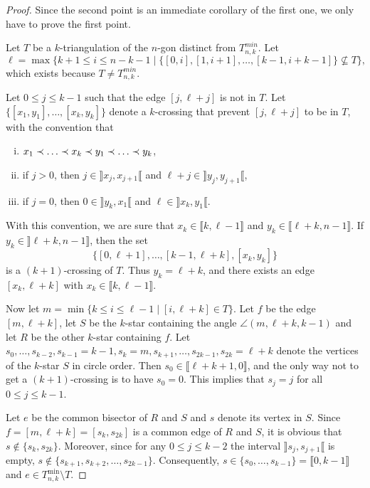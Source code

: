 \documentclass[12pt]{amsart}
\begin{document}
\begin{proof}
Since the second point is an immediate corollary of the first one, we only have to prove the first point.

Let $T$ be a $k$-triangulation of the $n$-gon distinct from $T_{n,k}^{min}$. Let
$$\ell=\max\{k+1\le i\le n-k-1\;|\;\{[0,i],[1,i+1],\ldots,[k-1,i+k-1]\}\nsubseteq T\},$$
which exists because $T\ne T_{n,k}^{min}$.

Let $0\le j\le k-1$ such that the edge $[j,\ell+j]$ is not in $T$. Let $\{[x_1,y_1],\ldots,[x_k,y_k]\}$ denote a $k$-crossing that prevent $[j,\ell+j]$ to be in $T$, with the convention that
\begin{enumerate}[(i)]
\item $x_1\prec \ldots\prec x_k\prec y_1\prec \ldots\prec y_k$,
\item if $j>0$, then $j\in\rrbracket x_j,x_{j+1}\llbracket$ and $\ell+j\in\rrbracket y_j,y_{j+1}\llbracket$,
\item if $j=0$, then $0\in\rrbracket y_k,x_1\llbracket$ and $\ell\in\rrbracket x_k,y_1\llbracket$.
\end{enumerate}
With this convention, we are sure that $x_k\in\llbracket k,\ell-1\rrbracket$ and $y_k\in\llbracket \ell+k,n-1\rrbracket$. If $y_k\in \rrbracket \ell+k,n-1\rrbracket$, then the set
$$\{[0,\ell+1],\ldots,[k-1,\ell+k],[x_k,y_k]\}$$
is a $(k+1)$-crossing of $T$. Thus $y_k=\ell+k$, and there exists an edge $[x_k,\ell+k]$ with $x_k\in\llbracket k,\ell-1\rrbracket$.

Now let $m=\min\{k\le i\le \ell-1\;|\; [i,\ell+k]\in T\}$. Let $f$ be the edge $[m,\ell+k]$, let $S$ be the $k$-star containing the angle $\angle(m,\ell+k,k-1)$ and let $R$ be the other $k$-star containing $f$. Let $s_0, \ldots,s_{k-2},s_{k-1}=k-1,s_k=m,s_{k+1},\ldots,s_{2k-1},s_{2k}=\ell+k$ denote the vertices of the $k$-star $S$ in circle order. Then $s_0\in\llbracket \ell+k+1, 0\rrbracket$, and the only way not to get a $(k+1)$-crossing is to have $s_0=0$. This implies that $s_j=j$ for all $0\le j\le k-1$. 

Let $e$ be the common bisector of $R$ and $S$ and $s$ denote its vertex in $S$. Since $f=[m,\ell+k]=[s_k,s_{2k}]$ is a common edge of $R$ and $S$, it is obvious that $s\notin\{s_k,s_{2k}\}$. Moreover, since for any $0\le j\le k-2$ the interval $\rrbracket s_j,s_{j+1}\llbracket$ is empty, $s\notin\{s_{k+1},s_{k+2},\ldots,s_{2k-1}\}$. Consequently, $s\in\{s_0,\ldots,s_{k-1}\}=\llbracket 0,k-1\rrbracket$ and $e\in T_{n,k}^{\min}\setminus T$.
\end{proof}
\end{document}
